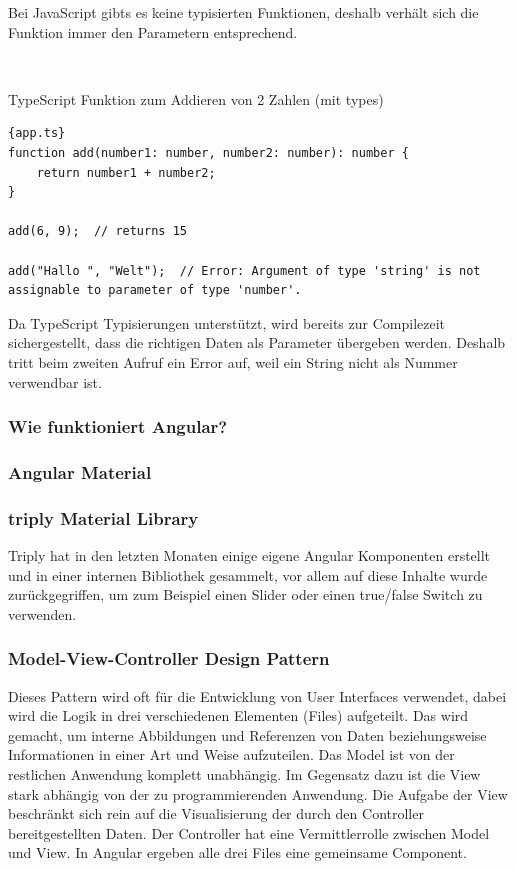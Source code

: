 Bei JavaScript gibts es keine typisierten Funktionen, deshalb verhält sich die Funktion immer den Parametern entsprechend.

\

TypeScript Funktion zum Addieren von 2 Zahlen (mit types)
\begin{lstlisting}[label={lst:add-function-ts}]{app.ts}
function add(number1: number, number2: number): number {
    return number1 + number2;
}
    
add(6, 9);  // returns 15

add("Hallo ", "Welt");  // Error: Argument of type 'string' is not assignable to parameter of type 'number'.
\end{lstlisting}

Da TypeScript Typisierungen unterstützt, wird bereits zur Compilezeit sichergestellt, dass die richtigen Daten als Parameter übergeben werden.
Deshalb tritt beim zweiten Aufruf ein Error auf, weil ein String nicht als Nummer verwendbar ist.

\cite{typescript-landing-page, what-is-typescript}

\subsubsection{Wie funktioniert Angular?}

\subsubsection{Angular Material}

\subsubsection{triply Material Library}
Triply hat in den letzten Monaten einige eigene Angular Komponenten erstellt und in einer internen Bibliothek
gesammelt, vor allem auf diese Inhalte wurde zurückgegriffen, um zum Beispiel einen Slider oder einen true/false Switch
zu verwenden.

\subsubsection{Model-View-Controller Design Pattern}
Dieses Pattern wird oft für die Entwicklung von User Interfaces verwendet,
dabei wird die Logik in drei verschiedenen Elementen (Files) aufgeteilt.
Das wird gemacht, um interne Abbildungen und Referenzen von Daten beziehungsweise Informationen
in einer Art und Weise aufzuteilen.
Das Model ist von der restlichen Anwendung komplett
unabhängig.
Im Gegensatz dazu ist die View stark abhängig von der zu programmierenden Anwendung.
Die Aufgabe der View beschränkt sich rein auf die Visualisierung der durch den Controller bereitgestellten Daten.
Der Controller hat eine Vermittlerrolle zwischen Model und View.
In Angular ergeben alle drei Files eine gemeinsame Component.

